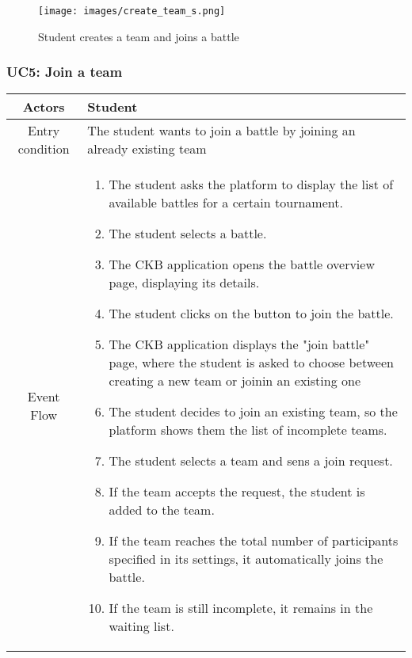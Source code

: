 \documentclass[a4paper, 11pt, titlepage]{article}
\begin{document}
\begin{figure}[h!]
    \centering
    \texttt{[image: images/create\_team\_s.png]}
    \caption{Student creates a team and joins a battle}
    \label{fig:seq_diag_create_team}
    
\end{figure}

\clearpage

\subsubsection*{UC5: Join a team}

\begin{center}
    \begin{tabularx}{\linewidth} {|c|X|}
        \hline 
        Actors & Student\\
        \hline 
        Entry condition &
        The student wants to join a battle by joining an already existing team\\
        \hline 
        Event Flow &
        \begin{enumerate}
            \item The student asks the platform to display the list of available battles 
            for a certain tournament.
            \item The student selects a battle.
            \item The CKB application opens the battle overview page, displaying its details.
            \item The student clicks on the button to join the battle.
            \item The CKB application displays the "join battle" page, where the student is asked to choose between creating a new team or joinin an 
            existing one
            \item The student decides to join an existing team, so the platform shows them the list of incomplete teams.
            \item The student selects a team and sens a join request.
            \item If the team accepts the request, the student is added to the team.
            \item If the team reaches the total number of participants specified in its settings, it automatically joins the battle.
            \item If the team is still incomplete, it remains in the waiting list. 
        \end{enumerate}\\

\end{tabularx}
\end{center}
\end{document}
